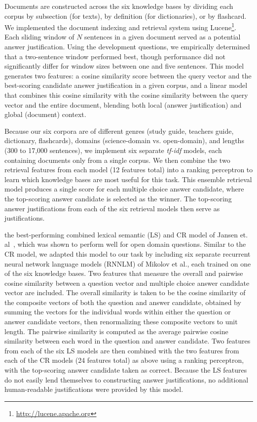 Documents are constructed across the six knowledge bases by dividing each corpus by subsection (for texts), by definition (for dictionaries), or by flashcard.  We implemented the document indexing and retrieval system using Lucene\footnote{\url{http://lucene.apache.org}}.  Each sliding window of $N$ sentences in a given document served as a potential answer justification. Using the development questions, we empirically determined that a two-sentence window performed best, though performance did not significantly differ for window sizes between one and five sentences.  This  model generates two features: a cosine similarity score between the query vector and the best-scoring candidate answer justification in a given corpus, and a linear model that combines this cosine similarity with the cosine similarity between the query vector and the entire document, blending both local (answer justification) and global (document) context. 

Because our six corpora are of different genres (study guide, teachers guide, dictionary, flashcards), domains (science-domain vs. open-domain), and lengths (300 to 17,000 sentences), we implement six separate {\em tf-idf} models, each containing documents only from a single corpus. We then combine the two retrieval features from each model (12 features total) into a ranking perceptron \cite{Shen:Joshi:2005,Surdeanu:11} to learn which knowledge bases are most useful for this task.  This ensemble retrieval model produces a single score for each multiple choice answer candidate, where the top-scoring answer candidate is selected as the winner.  The top-scoring answer justifications from each of the six retrieval models then serve as justifications. 


 
{} the best-performing combined lexical semantic (LS) and CR model of Jansen et. al~, which was shown to perform well for open domain questions.  Similar to the CR model, we adapted this model to our task by including six separate recurrent neural network language models (RNNLM) of Mikolov et al., each trained on one of the six knowledge bases.  Two features that measure the overall and pairwise cosine similarity between a question vector and multiple choice answer candidate vector are included.  The overall similarity is taken to be the cosine similarity of the composite vectors of both the question and answer candidate, obtained by summing the vectors for the individual words within either the question or answer candidate vectors, then renormalizing these composite vectors to unit length.  The pairwise similarity is computed as the average pairwise cosine similarity between each word in the question and answer candidate.  Two features from each of the six LS models are then combined with the two features from each of the CR models (24 features total) as above using a ranking perceptron, with the top-scoring answer candidate taken as correct.  Because the LS features do not easily lend themselves to constructing answer justifications, no additional human-readable justifications were provided by this model. 


